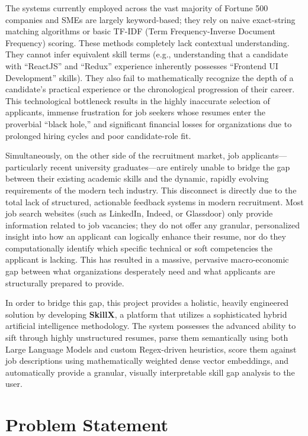 \documentclass[12pt,a4paper]{report}
\begin{document}
The systems currently employed across the vast majority of Fortune 500 companies and SMEs are largely keyword-based; they rely on naive exact-string matching algorithms or basic TF-IDF (Term Frequency-Inverse Document Frequency) scoring. These methods completely lack contextual understanding. They cannot infer equivalent skill terms (e.g., understanding that a candidate with ``ReactJS'' and ``Redux'' experience inherently possesses ``Frontend UI Development'' skills). They also fail to mathematically recognize the depth of a candidate's practical experience or the chronological progression of their career. This technological bottleneck results in the highly inaccurate selection of applicants, immense frustration for job seekers whose resumes enter the proverbial ``black hole,'' and significant financial losses for organizations due to prolonged hiring cycles and poor candidate-role fit.

Simultaneously, on the other side of the recruitment market, job applicants---particularly recent university graduates---are entirely unable to bridge the gap between their existing academic skills and the dynamic, rapidly evolving requirements of the modern tech industry. This disconnect is directly due to the total lack of structured, actionable feedback systems in modern recruitment. Most job search websites (such as LinkedIn, Indeed, or Glassdoor) only provide information related to job vacancies; they do not offer any granular, personalized insight into how an applicant can logically enhance their resume, nor do they computationally identify which specific technical or soft competencies the applicant is lacking. This has resulted in a massive, pervasive macro-economic gap between what organizations desperately need and what applicants are structurally prepared to provide.

In order to bridge this gap, this project provides a holistic, heavily engineered solution by developing \textbf{SkillX}, a platform that utilizes a sophisticated hybrid artificial intelligence methodology. The system possesses the advanced ability to sift through highly unstructured resumes, parse them semantically using both Large Language Models and custom Regex-driven heuristics, score them against job descriptions using mathematically weighted dense vector embeddings, and automatically provide a granular, visually interpretable skill gap analysis to the user.

\section{Problem Statement}
\end{document}
